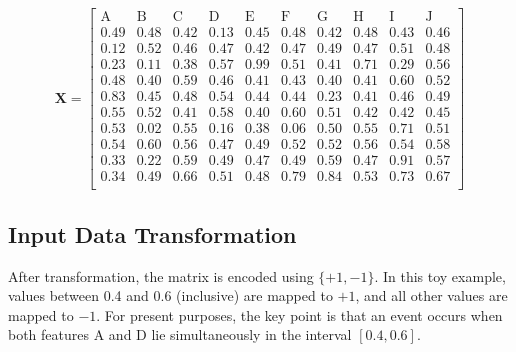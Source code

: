\begingroup
\footnotesize
\setlength{\arraycolsep}{3pt}
\begin{equation}\label{eq:rq1-toy-raw-feature-matrix}
\mathbf{X} =
\left[ \begin{array}{rrrrrrrrrr}
	\text{A} & \text{B} & \text{C} & \text{D} & \text{E} & \text{F} & \text{G} & \text{H} & \text{I} & \text{J} \\
	0.49 &  0.48 &  0.42 & 0.13 & 0.45 & 0.48 & 0.42 & 0.48 & 0.43 & 0.46 \\
	0.12 &  0.52 &  0.46 & 0.47 & 0.42 & 0.47 & 0.49 & 0.47 & 0.51& 0.48 \\
	0.23 &  0.11 &  0.38 & 0.57 & 0.99 & 0.51 & 0.41 & 0.71 & 0.29 & 0.56 \\ 
	\mathbf{0.48} &  0.40 & 0.59 & \mathbf{0.46} & 0.41 & 0.43 & 0.40 & 0.41 & 0.60 & 0.52\\
	0.83 &  0.45 &  0.48 &  0.54 &  0.44 & 0.44 & 0.23 & 0.41 & 0.46 & 0.49 \\
	\mathbf{0.55} &  0.52 & 0.41 &  \mathbf{0.58} & 0.40 & 0.60 & 0.51 & 0.42 & 0.42 & 0.45\\
	0.53 & 0.02 &  0.55 & 0.16 & 0.38 & 0.06 &  0.50 &  0.55 & 0.71 & 0.51 \\
	\mathbf{0.54} & 0.60 &  0.56 & \mathbf{0.47} &  0.49 & 0.52 &  0.52 & 0.56 & 0.54 & 0.58 \\
	0.33 & 0.22 &  0.59 & 0.49 &  0.47 & 0.49 &  0.59 & 0.47 & 0.91 & 0.57\\
	0.34 & 0.49 & 0.66 &  0.51 &  0.48 & 0.79 & 0.84 & 0.53 & 0.73 & 0.67 \\
\end{array} \right]
\end{equation}
\endgroup

\newpage

\subsection{Input Data Transformation}
After transformation, the matrix is encoded using $\{+1,-1\}$. In this toy example, values between 0.4 and 0.6 (inclusive) are mapped to $+1$, and all other values are mapped to $-1$. For present purposes, the key point is that an event occurs when both features A and D lie simultaneously in the interval $[0.4,0.6]$.

